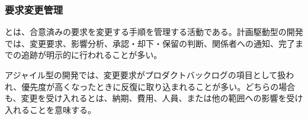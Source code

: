 \subsubsection{要求変更管理}

とは、合意済みの要求を変更する手順を管理する活動である。計画駆動型の開発では、変更要求、影響分析、承認・却下・保留の判断、関係者への通知、完了までの追跡が明示的に行われることが多い。

アジャイル型の開発では、変更要求がプロダクトバックログの項目として扱われ、優先度が高くなったときに反復に取り込まれることが多い。どちらの場合も、変更を受け入れるとは、納期、費用、人員、または他の範囲への影響を受け入れることを意味する。
